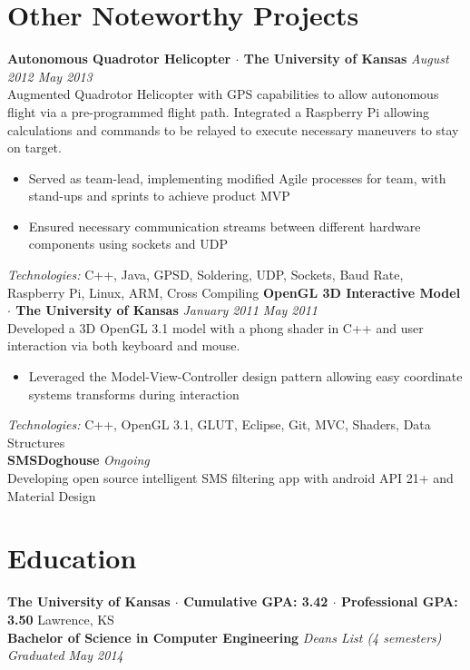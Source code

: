 \documentclass[10pt]{article}
\begin{document}
\section*{Other Noteworthy Projects}
\textbf{Autonomous Quadrotor Helicopter $\cdot$ The University of Kansas} \hfill \textit{August 2012 \textendash{} May 2013} \\
Augmented Quadrotor Helicopter with GPS capabilities to allow autonomous flight via a pre-programmed flight path. Integrated a Raspberry Pi allowing calculations and commands to be relayed to execute necessary maneuvers to stay on target.
\begin{itemize}
  \item Served as team-lead, implementing modified Agile processes for team, with stand-ups and sprints to achieve product MVP
  \item Ensured necessary communication streams between different hardware components using sockets and UDP
\end{itemize}
\textit{Technologies:} C++, Java, GPSD, Soldering, UDP, Sockets, Baud Rate, Raspberry Pi, Linux, ARM, Cross Compiling
\textbf{OpenGL 3D Interactive Model $\cdot$ The University of Kansas} \hfill \textit{January 2011 \textendash{} May 2011} \\
Developed a 3D OpenGL 3.1 model with a phong shader in C++ and user interaction via both keyboard and mouse.
\begin{itemize}
  \item Leveraged the Model-View-Controller design pattern allowing easy coordinate systems transforms during interaction
\end{itemize}
\textit{Technologies:} C++, OpenGL 3.1, GLUT, Eclipse, Git, MVC, Shaders, Data Structures \\
\textbf{SMSDoghouse} \hfill \textit{Ongoing} \\
Developing open source intelligent SMS filtering app with android API 21+ and Material Design

\section*{Education}
\textbf{The University of Kansas $\cdot$ Cumulative GPA: 3.42 $\cdot$ Professional GPA: 3.50}
\hfill
Lawrence, KS \\
\textbf{Bachelor of Science in Computer Engineering}
\textit{\textendash{} Dean\textquotesingle{}s List (4 semesters)}
\hfill
\textit{Graduated May 2014}
\end{document}
